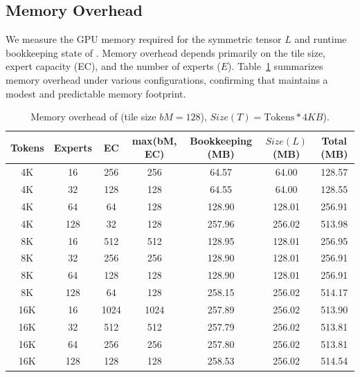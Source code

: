 \subsection{Memory Overhead}\label{sec:eval:memory}
We measure the GPU memory required for the symmetric tensor $L$ and runtime bookkeeping state of \sysname.
Memory overhead depends primarily on the tile size, expert capacity (EC), and the number of experts ($E$).
Table~\ref{tab:memory-overhead} summarizes memory overhead under various configurations, confirming that \sysname maintains a modest and predictable memory footprint.
\begin{table}[!ht]
    \centering
    \caption{Memory overhead of \sysname (tile size $bM = 128$), $Size(T) = \text{Tokens} * 4KB$).}
    \label{tab:memory-overhead}
    \small
    \setlength{\tabcolsep}{5pt}
    \renewcommand{\arraystretch}{0.9}
    \begin{tabular}{ccccccc}
        \toprule
        \textbf{Tokens} & \textbf{Experts} & \textbf{EC} & \textbf{max(bM, EC)} & \textbf{Bookkeeping (MB)} & $Size(L)$ \textbf{(MB)} & \textbf{Total (MB)} \\
        \midrule
        4K  & 16  & 256  & 256  & 64.57  & 64.00  & 128.57 \\
        4K  & 32  & 128  & 128  & 64.55  & 64.00  & 128.55 \\
        4K  & 64  & 64   & 128  & 128.90 & 128.01 & 256.91 \\
        4K  & 128 & 32   & 128  & 257.96 & 256.02 & 513.98 \\
        \midrule
        8K  & 16  & 512  & 512  & 128.95 & 128.01 & 256.95 \\
        8K  & 32  & 256  & 256  & 128.90 & 128.01 & 256.91 \\
        8K  & 64  & 128  & 128  & 128.90 & 128.01 & 256.91 \\
        8K  & 128 & 64   & 128  & 258.15 & 256.02 & 514.17 \\
        \midrule
        16K & 16  & 1024 & 1024 & 257.89 & 256.02 & 513.90 \\
        16K & 32  & 512  & 512  & 257.79 & 256.02 & 513.81 \\
        16K & 64  & 256  & 256  & 257.80 & 256.02 & 513.81 \\
        16K & 128 & 128  & 128  & 258.53 & 256.02 & 514.54 \\
        \bottomrule
    \end{tabular}
    \vspace{-0.4cm}
\end{table}
